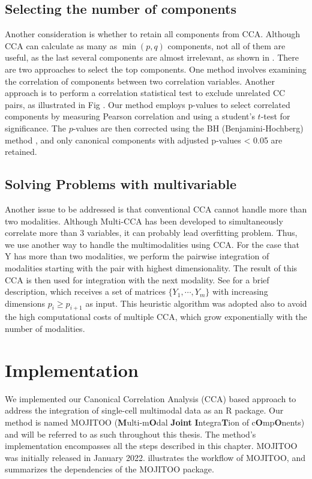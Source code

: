 \subsection{Selecting the number of components}
Another consideration is whether to retain all components from CCA. Although CCA can calculate as many as $\min(p, q)$ components, not all of them are useful, as the last several components are almost irrelevant, as shown in . There are two approaches to select the top components. One method involves examining the correlation of components between two correlation variables. Another approach is to perform a correlation statistical test to exclude unrelated CC pairs, as illustrated in Fig . Our method employs p-values to select correlated components by measuring Pearson correlation and using a student's $t$-test for significance. The $p$-values are then corrected using the BH (Benjamini-Hochberg) method \cite{benjamini1995controlling}, and only canonical components with adjusted p-values < 0.05 are retained.

\subsection{Solving Problems with multivariable}
Another issue to be addressed is that conventional CCA cannot handle more than two modalities. Although Multi-CCA has been developed to simultaneously correlate more than 3 variables, it can probably lead overfitting problem. Thus, we use another way to handle the multimodalities using CCA. For the case that Y has more than two modalities, we perform the pairwise integration of modalities starting with the pair with highest dimensionality. The result of this CCA is then used for integration
with the next modality. See  for a brief description, which receives a set of matrices $\{Y_{1},\cdots, Y_{m}\}$ with increasing dimensions $p_{i}\geq p_{i+1}$ as input. This heuristic algorithm was adopted also to avoid the high computational costs of multiple CCA, which grow exponentially with the number of modalities.

\section{Implementation}
\label{methods:integration:imp}
We implemented our Canonical Correlation Analysis (CCA) based approach to address the integration of single-cell multimodal data as an R package. Our method is named MOJITOO (\textbf{M}ulti-m\textbf{O}dal \textbf{Joint} \textbf{I}ntegra\textbf{T}ion of c\textbf{O}mp\textbf{O}nents) and will be referred to as such throughout this thesis. The method's implementation encompasses all the steps described in this chapter. MOJITOO was initially released in January 2022.  illustrates the workflow of MOJITOO, and  summarizes the dependencies of the MOJITOO package.


